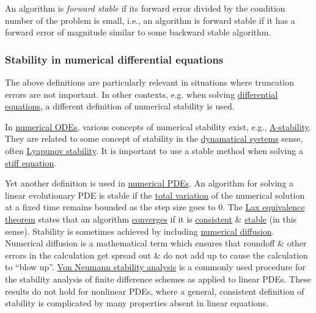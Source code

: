 \documentclass{article}
\begin{document}
An algorithm is {\it forward stable} if its forward error divided by the condition number of the problem is small, i.e., an algorithm is forward stable if it has a forward error of magnitude similar to some backward stable algorithm.

\subsubsection{Stability in numerical differential equations}
The above definitions are particularly relevant in situations where truncation errors are not important. In other contexts, e.g. when solving \href{https://en.wikipedia.org/wiki/Differential_equation}{differential equations}, a different definition of numerical stability is used.

In \href{https://en.wikipedia.org/wiki/Differential_equation}{numerical ODEs}, various concepts of numerical stability exist, e.g., \href{https://en.wikipedia.org/wiki/Stiff_equation#A-stability}{A-stability}. They are related to some concept of stability in the \href{https://en.wikipedia.org/wiki/Dynamical_system}{dynamatical systems} sense, often \href{https://en.wikipedia.org/wiki/Lyapunov_stability}{Lyapunov stability}. It is important to use a stable method when solving a \href{https://en.wikipedia.org/wiki/Stiff_equation}{stiff equation}.

Yet another definition is used in \href{https://en.wikipedia.org/wiki/Numerical_partial_differential_equations}{numerical PDEs}. An algorithm for solving a linear evolutionary PDE is stable if the \href{https://en.wikipedia.org/wiki/Total_variation}{total variation} of the numerical solution at a fixed time remains bounded as the step size goes to 0. The \href{https://en.wikipedia.org/wiki/Lax_equivalence_theorem}{Lax equivalence theorem} states that an algorithm \href{https://en.wikipedia.org/wiki/Numerical_methods_for_ordinary_differential_equations#Convergence}{converges} if it is \href{https://en.wikipedia.org/wiki/Numerical_methods_for_ordinary_differential_equations#Consistency_and_order}{consistent} \& \href{https://en.wikipedia.org/wiki/Numerical_methods_for_ordinary_differential_equations#Stability_and_stiffness}{stable} (in this sense). Stability is sometimes achieved by including \href{https://en.wikipedia.org/wiki/Numerical_diffusion}{numerical diffusion}. Numerical diffusion is a mathematical term which ensures that roundoff \& other errors in the calculation get spread out \& do not add up to cause the calculation to ``blow up''. \href{https://en.wikipedia.org/wiki/Von_Neumann_stability_analysis}{Von Neumann stability analysis} is a commonly used procedure for the stability analysis of finite difference schemes as applied to linear PDEs. These results do not hold for nonlinear PDEs, where a general, consistent definition of stability is complicated by many properties absent in linear equations.
\end{document}
